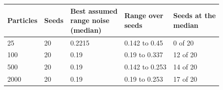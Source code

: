 \begin{tabular}{lllll}
\toprule
Particles & Seeds & \shortstack[l]{Best assumed\\range noise\\(median)} & \shortstack[l]{Range over\\seeds} & \shortstack[l]{Seeds at the\\median} \\
\midrule
25 & 20 & 0.2215 & 0.142 to 0.45 & 0 of 20 \\
100 & 20 & 0.19 & 0.19 to 0.337 & 12 of 20 \\
500 & 20 & 0.19 & 0.142 to 0.253 & 14 of 20 \\
2000 & 20 & 0.19 & 0.19 to 0.253 & 17 of 20 \\
\bottomrule
\end{tabular}
